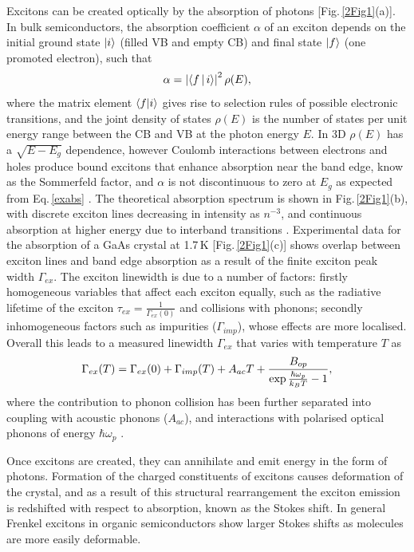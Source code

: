 Excitons can be created optically by the absorption of photons [Fig.\,\ref{2Fig1}(a)]. In bulk semiconductors, the absorption coefficient $\alpha$ of an exciton depends on the initial ground state $\ket{i}$ (filled VB and empty CB) and final state $\ket{f}$ (one promoted electron), such that
\begin{equation}
\centering
\alpha = \left| \Braket{f | i} \right|^2 \rho(E) ,
\label{exabs}
\end{equation}
where the matrix element $\braket{f | i}$ gives rise to selection rules of possible electronic transitions, and the joint density of states $\rho(E)$ is the number of states per unit energy range between the CB and VB at the photon energy $E$. In 3D $\rho(E)$ has a $\sqrt{E-E_g}$ dependence, %
however Coulomb interactions between electrons and holes produce bound excitons that enhance absorption near the band edge, know as the Sommerfeld factor, %
and $\alpha$ is not discontinuous to zero at $E_g$ as expected from Eq.\,\ref{exabs} \cite{Bassu1997}. The theoretical absorption spectrum is shown in Fig.\,\ref{2Fig1}(b), with discrete exciton lines decreasing in intensity as $n^{-3}$, and continuous absorption at higher energy due to interband transitions \cite{Bassu1997}. Experimental data for the absorption of a GaAs crystal at 1.7\,K [Fig.\,\ref{2Fig1}(c)] shows overlap between exciton lines and band edge absorption as a result of the finite exciton peak width $\Gamma_{ex}$. The exciton linewidth is due to a number of factors: firstly homogeneous variables that affect each exciton equally, such as the radiative lifetime of the exciton $\tau_{ex} = \frac{1}{\Gamma_{ex}(0)}$ and collisions with phonons; secondly inhomogeneous factors such as impurities ($\Gamma_{imp}$), whose effects are more localised. Overall this leads to a measured linewidth $\Gamma_{ex}$ that varies with temperature $T$ as
\begin{equation}
\centering
\Gamma_{ex}(T) = \Gamma_{ex}(0) +  \Gamma_{imp}(T) +A_{ac}T + \frac{B_{op}}{\exp{\frac{\hbar\omega_p}{k_B T}}-1},
\label{exwidth}
\end{equation}
where the contribution to phonon collision has been further separated into coupling with acoustic phonons ($A_{ac}$), and interactions with polarised optical phonons of energy $\hbar\omega_p$ \cite{Dammak2009}. 

Once excitons are created, they can annihilate and emit energy in the form of photons. Formation of the charged constituents of excitons causes deformation of the crystal, and as a result of this structural rearrangement the exciton emission is redshifted with respect to absorption, known as the Stokes shift. In general Frenkel excitons in organic semiconductors show larger Stokes shifts as molecules are more easily deformable.

